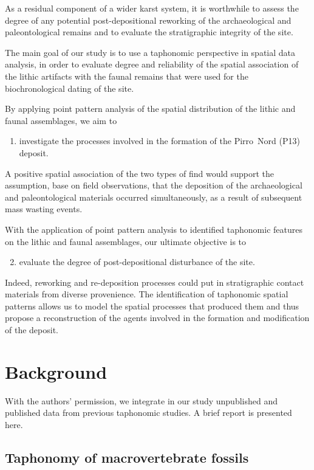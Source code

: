 \documentclass[review,authoryear]{elsarticle} %
\begin{document}
As a residual component of a wider karst system, it is worthwhile to assess the degree of any potential post-depositional reworking of the archaeological and paleontological remains and to evaluate the stratigraphic integrity of the site. 

The main goal of our study is to use a taphonomic perspective in spatial data analysis, in order to evaluate degree and reliability of the spatial association of the lithic artifacts with the faunal remains that were used for the biochronological dating of the site.

By applying point pattern analysis of the spatial distribution of the lithic and faunal assemblages, we aim to
\begin{enumerate}
  \item investigate the processes involved in the formation of the Pirro~Nord (P13) deposit.
\end{enumerate}
A positive spatial association of the two types of find would support the assumption, base on field observations, that the deposition of the archaeological and paleontological materials occurred simultaneously, as a result of subsequent mass wasting events.

With the application of point pattern analysis to identified taphonomic features on the lithic and faunal assemblages, our ultimate objective is to 
\begin{enumerate}
  \setcounter{enumi}{1}
  \item evaluate the degree of post-depositional disturbance of the site.
\end{enumerate}
Indeed, reworking and re-deposition processes could put in stratigraphic contact materials from diverse provenience. The identification of taphonomic spatial patterns allows us to model the spatial processes that produced them and thus propose a reconstruction of the agents involved in the formation and modification of the deposit.

\section{Background}

With the authors' permission, we integrate in our study unpublished \citep{Bagnus2011} and published \citep{Arzarello2012,Arzarello2015} data from previous taphonomic studies. A brief report is presented here.

\subsection{Taphonomy of macrovertebrate fossils}
\end{document}
